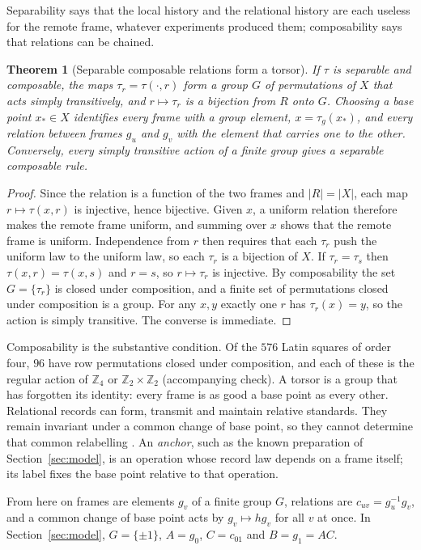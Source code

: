 \documentclass[11pt,a4paper]{article}
\newtheorem{theorem}[definition]{Theorem}
\begin{document}
Separability says that the local history and the relational history are each useless for the remote frame, whatever experiments produced them; composability says that relations can be chained.

\begin{theorem}[Separable composable relations form a torsor]\label{thm:torsor}
If $\tau$ is separable and composable, the maps $\tau_r=\tau(\cdot,r)$ form a group $G$ of permutations of $X$ that acts simply transitively, and $r\mapsto\tau_r$ is a bijection from $R$ onto $G$. Choosing a base point $x_\ast\in X$ identifies every frame with a group element, $x=\tau_g(x_\ast)$, and every relation between frames $g_u$ and $g_v$ with the element that carries one to the other. Conversely, every simply transitive action of a finite group gives a separable composable rule.
\end{theorem}
\begin{proof}
Since the relation is a function of the two frames and $|R|=|X|$, each map $r\mapsto\tau(x,r)$ is injective, hence bijective. Given $x$, a uniform relation therefore makes the remote frame uniform, and summing over $x$ shows that the remote frame is uniform. Independence from $r$ then requires that each $\tau_r$ push the uniform law to the uniform law, so each $\tau_r$ is a bijection of $X$. If $\tau_r=\tau_s$ then $\tau(x,r)=\tau(x,s)$ and $r=s$, so $r\mapsto\tau_r$ is injective. By composability the set $G=\{\tau_r\}$ is closed under composition, and a finite set of permutations closed under composition is a group. For any $x,y$ exactly one $r$ has $\tau_r(x)=y$, so the action is simply transitive. The converse is immediate.
\end{proof}

Composability is the substantive condition. Of the $576$ Latin squares of order four, $96$ have row permutations closed under composition, and each of these is the regular action of $\mathbb Z_4$ or $\mathbb Z_2\times\mathbb Z_2$ (accompanying check). A torsor is a group that has forgotten its identity: every frame is as good a base point as every other. Relational records can form, transmit and maintain relative standards. They remain invariant under a common change of base point, so they cannot determine that common relabelling \cite{TDOMEIII}. An \emph{anchor}, such as the known preparation of Section~\ref{sec:model}, is an operation whose record law depends on a frame itself; its label fixes the base point relative to that operation.

From here on frames are elements $g_v$ of a finite group $G$, relations are $c_{uv}=g_u^{-1}g_v$, and a common change of base point acts by $g_v\mapsto hg_v$ for all $v$ at once. In Section~\ref{sec:model}, $G=\{\pm1\}$, $A=g_0$, $C=c_{01}$ and $B=g_1=AC$.
\end{document}
